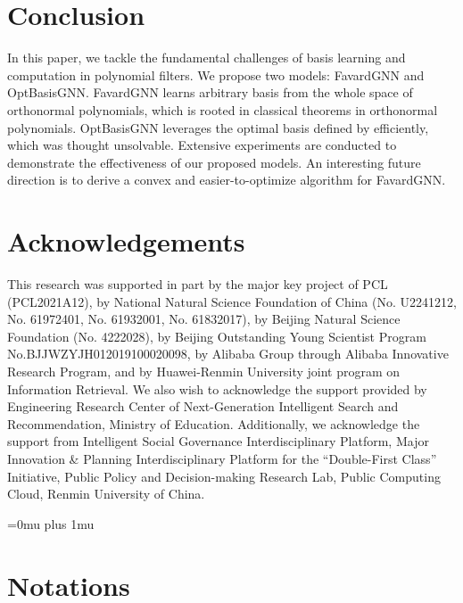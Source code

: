  \section{Conclusion}
In this paper, 
we tackle the fundamental challenges of basis learning and computation in polynomial filters. 
We propose two models: FavardGNN and OptBasisGNN. 
FavardGNN learns arbitrary basis from the whole space of orthonormal polynomials, 
which is rooted in classical theorems in orthonormal polynomials.
OptBasisGNN leverages the optimal basis defined by \citet{Wang2022jacobi} efficiently, 
which was thought unsolvable.   
Extensive experiments are conducted to demonstrate the effectiveness of our proposed models. An interesting future direction is to derive a convex and easier-to-optimize algorithm for FavardGNN. 

\section*{Acknowledgements}
This research was supported in part by the major key project of PCL (PCL2021A12), by National Natural Science Foundation of China (No. U2241212, No. 61972401, No. 61932001, No. 61832017), 
by Beijing Natural Science Foundation (No. 4222028), by Beijing Outstanding Young Scientist Program No.BJJWZYJH012019100020098, by Alibaba Group through Alibaba Innovative Research Program, and by Huawei-Renmin University joint program on Information Retrieval. We also wish to acknowledge the support provided by Engineering Research Center of Next-Generation Intelligent Search and Recommendation, Ministry of Education. Additionally, we acknowledge the support from Intelligent Social Governance Interdisciplinary Platform, Major Innovation \& Planning Interdisciplinary Platform for the “Double-First Class” Initiative, Public Policy and Decision-making Research Lab, Public Computing Cloud, Renmin University of China. 

\Urlmuskip=0mu plus 1mu \relax



\newpage
\appendix
\onecolumn
\section{Notations}



